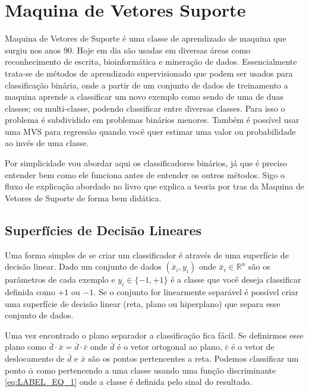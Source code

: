 \chapter{Maquina de Vetores Suporte}\label{chp:LABEL_CHP_2}



Maquina de Vetores de Suporte é uma classe de aprendizado de maquina que surgiu nos anos 90. Hoje em dia são usadas em diversas áreas como reconhecimento de escrita, bioinformática e mineração de dados.	Essencialmente trata-se de métodos de aprendizado supervisionado que podem ser usados para classificação binária, onde a partir de um conjunto de dados de treinamento a maquina aprende a classificar um novo exemplo como sendo de uma de duas classes; ou multi-classe, podendo classificar entre diversas classes. Para isso o problema é subdividido em problemas binários menores. Também é possível usar uma MVS para regressão quando você quer estimar uma valor ou probabilidade ao invés de uma classe. 

Por simplicidade vou abordar aqui os classificadores binários, já que é preciso entender bem como ele funciona antes de entender os outros métodos. Sigo o fluxo de explicação abordado no livro \cite{art:LIVRO_SVM} que explica a teoria por tras da Maquina de Vetores de Suporte de forma bem didática.

\section{Superfícies de Decisão Lineares}
Uma forma simples de se criar um classificador é através de uma superfície de decisão linear. Dado um conjunto de dados $(\bar{x}_i,y_i)$ onde $\bar{x}_i \in \mathbb{R}^n$ são os parâmetros de cada exemplo e $y_i \in \{ -1,+1 \}$ é a classe que você deseja classificar definida como $+1$ ou $-1$. Se o conjunto for linearmente separável é possível criar uma superfície de decisão linear (reta, plano ou hiperplano) que separa esse conjunto de dados.

Uma vez encontrado o plano separador a classificação fica fácil. Se definirmos esse plano como $\bar{d}\cdot \bar{x} = \bar{d}\cdot \bar{c}$ onde $\bar{d}$ é o vetor ortogonal ao plano, $\bar{c}$ é o vetor de deslocamento de $\bar{d}$ e $\bar{x}$ são os pontos pertencentes a reta. Podemos classificar um ponto $\bar{\alpha}$ como pertencendo a uma classe usando uma função discriminante \ref{eq:LABEL_EQ_1} onde a classe é definida pelo sinal do resultado.

